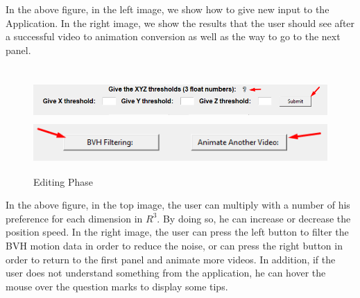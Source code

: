 In the above figure, in the left image, we show how to give new input to the Application. In the right image, we show the results that the user should see after a successful video to animation conversion as well as the way to go to the next panel.\\\\

\begin{figure}[htp]
	\centering
	{\includegraphics[height=1.5cm,width=0.7\linewidth]{figures/Requirements/Workflow2_1.png}}
	\hspace{1em}%
	{\includegraphics[height=1.5cm, width=0.7\linewidth]{figures/Requirements/Workflow2_2.png}}
	\captionsetup{labelformat=empty}
	\caption{Editing Phase}
\end{figure}

In the above figure, in the top image, the user can multiply with a number of his preference for each dimension in $R^3$. By doing so, he can increase or decrease the position speed. In the right image, the user can press the left button to filter the BVH motion data in order to reduce the noise, or can press the right button in order to return to the first panel and animate more videos. In addition, if the user does not understand something from the application, he can hover the mouse over the question marks to display some tips.\\\\


